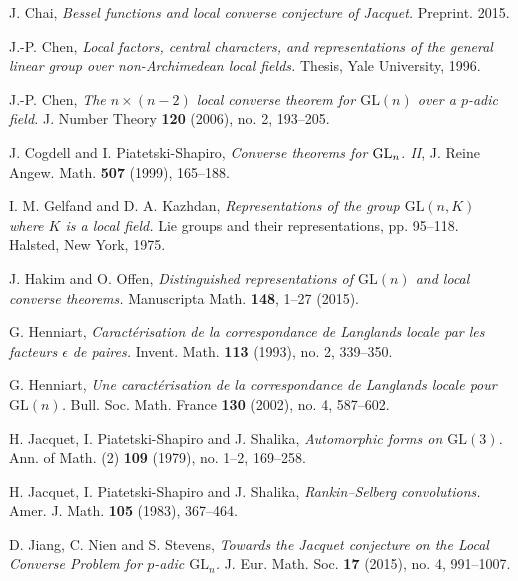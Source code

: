 \documentclass[12pt]{amsart}
\begin{document}
\begin{thebibliography}{}
J. Chai,
{\it Bessel functions and local converse conjecture of Jacquet.}
Preprint. 2015. 

J.-P. Chen,
{\it Local factors, central characters, and representations of the general linear group over non-Archimedean local fields.}
Thesis, Yale University, 1996.

J.-P. Chen,
{\it The $n \times (n-2)$ local converse theorem for ${{\mathrm{GL}}}(n)$ over a $p$-adic field.}
J. Number Theory \textbf{120} (2006), no. 2, 193--205.

J. Cogdell and I. Piatetski-Shapiro,
{\it Converse theorems for {${\rm
  GL}_n$}. {II}}, J. Reine Angew. Math. \textbf{507} (1999), 165--188.
  
I. M. Gelfand and D. A. Kazhdan,
{\it Representations of the group ${{\mathrm{GL}}}(n,K)$ where $K$ is a local field.} 
Lie groups and their representations, pp. 95--118. Halsted, New York, 1975.

J. Hakim and O. Offen,
{\it Distinguished representations of ${{\mathrm{GL}}}(n)$ and local
converse theorems.}
Manuscripta Math. {\bf 148}, 1--27 (2015).
  
 
 
 
 
G. Henniart,
{\it Caract\'erisation de la correspondance de Langlands locale par les facteurs $\epsilon$ de paires.}
Invent. Math. \textbf{113} (1993), no. 2, 339--350.
 
 
 
 
 
 

G. Henniart,
{\it Une caract\'erisation de la correspondance de Langlands locale pour ${{\mathrm{GL}}}(n)$.}
Bull. Soc. Math. France \textbf{130} (2002), no. 4, 587--602.

H. Jacquet, I. Piatetski-Shapiro and J. Shalika,
{\it Automorphic forms on ${{\mathrm{GL}}}(3)$.}
Ann. of Math. (2) \textbf{109} (1979), no. 1--2, 169--258.

H. Jacquet, I. Piatetski-Shapiro and J. Shalika,
{\it Rankin--Selberg convolutions.}
Amer. J. Math. \textbf{105} (1983), 367--464.

D. Jiang, C. Nien and S. Stevens,
{\it Towards the Jacquet conjecture on the Local Converse Problem for $p$-adic ${{\mathrm{GL}}}_n$.}
 J. Eur. Math. Soc. \textbf{17} (2015), no. 4, 991--1007.


\end{thebibliography}
\end{document}

